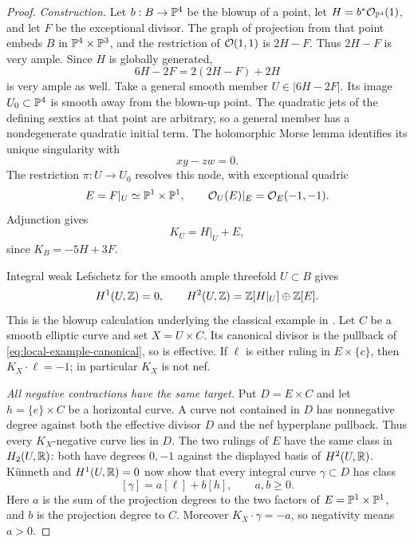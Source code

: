\begin{proof}
\emph{Construction.}
Let $b:B\to\mathbb P^4$ be the blowup of a point, let
$H=b^*\mathcal O_{\mathbb P^4}(1)$, and let $F$ be the exceptional divisor.
The graph of projection from that point embeds $B$ in
$\mathbb P^4\times\mathbb P^3$, and the restriction of $\mathcal O(1,1)$ is $2H-F$.
Thus $2H-F$ is very ample.  Since $H$ is globally generated,
\[
 6H-2F=2(2H-F)+2H
\]
is very ample as well.  Take a general smooth member
$U\in|6H-2F|$.
Its image $U_0\subset\mathbb P^4$ is smooth away from the blown-up point.
The quadratic jets of the defining sextics at that point are arbitrary,
so a general member has a nondegenerate quadratic initial term.
The holomorphic Morse lemma identifies its unique singularity with
\[
 xy-zw=0.
\]
The restriction $\pi:U\to U_0$ resolves this node, with exceptional
quadric
\[
 E=F|_U\simeq\mathbb P^1\times\mathbb P^1,
 \qquad \mathcal O_U(E)|_E=\mathcal O_E(-1,-1).
\]
Adjunction gives
\begin{equation}\label{eq:local-example-canonical}
 K_U=H|_U+E,
\end{equation}
since $K_B=-5H+3F$.

Integral weak Lefschetz for the smooth ample threefold $U\subset B$
\cite[Section~7, Corollary~7.3]{MilnorMorse1963} gives
\[
 H^1(U,\mathbb Z)=0,
 \qquad H^2(U,\mathbb Z)=\mathbb Z[H|_U]\oplus\mathbb Z[E].
\]
This is the blowup calculation underlying the classical example in
\cite[Definition~5.1, Remark~(b)]{Reid}.
Let $C$ be a smooth elliptic curve and set $X=U\times C$.
Its canonical divisor is the pullback of \eqref{eq:local-example-canonical},
so is effective.  If $\ell$ is either ruling in $E\times\{c\}$, then
$K_X\cdot\ell=-1$; in particular $K_X$ is not nef.

\emph{All negative contractions have the same target.}
Put $D=E\times C$ and let $h=\{e\}\times C$ be a horizontal curve.
A curve not contained in $D$ has nonnegative degree against both the
effective divisor $D$ and the nef hyperplane pullback.  Thus every
$K_X$-negative curve lies in $D$.
The two rulings of $E$ have the same class in $H_2(U,\mathbb R)$: both have degrees
$0,-1$ against the displayed basis of $H^2(U,\mathbb R)$.
Künneth and $H^1(U,\mathbb R)=0$ now show that every integral curve
$\gamma\subset D$ has class
\begin{equation}\label{eq:local-example-curve}
 [\gamma]=a[\ell]+b[h],\qquad a,b\geq0.
\end{equation}
Here $a$ is the sum of the projection degrees to the two factors of
$E=\mathbb P^1\times\mathbb P^1$, and $b$ is the projection degree to $C$.
Moreover $K_X\cdot\gamma=-a$, so negativity means $a>0$.


\end{proof}
